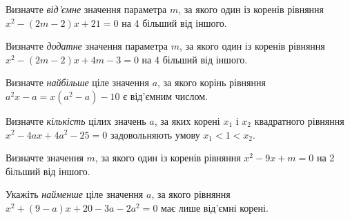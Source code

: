 \documentclass[12pt]{article}
\begin{document}
\begin{samepage}
\noindent\zadnum Визначте \textit{від'ємне} значення параметра $m$, за якого один із коренів рівняння $x^2 - (2m - 2)x + 21 = 0$ на 4 більший від іншого. 

\nmtnobreak
\nopagebreak\nbvspace{0.3cm}
\nmtAnswerBox
\par{}
\end{samepage}

\begin{samepage}
\noindent\zadnum Визначте \textit{додатне} значення параметра $m$, за якого один із коренів рівняння $x^2 - (2m - 2)x + 4m - 3 = 0$ на 4 більший від іншого. 

\nmtnobreak
\nopagebreak\nbvspace{0.3cm}
\nmtAnswerBox
\par{}
\end{samepage}

\begin{samepage}
\noindent\zadnum Визначте \textit{найбільше} ціле значення $a$, за якого корінь рівняння $a^2x - a = x(a^2 - a) - 10$ є від'ємним числом. 

\nmtnobreak
\nopagebreak\nbvspace{0.3cm}
\nmtAnswerBox
\par{}
\end{samepage}

\begin{samepage}
\noindent\zadnum Визначте \textit{кількість} цілих значень $a$, за яких корені $x_1$ і $x_2$ квадратного рівняння $x^2 - 4ax + 4a^2 - 25 = 0$ задовольняють умову $x_1 < 1 < x_2$. 

\nmtnobreak
\nopagebreak\nbvspace{0.3cm}
\nmtAnswerBox
\par{}
\end{samepage}

\begin{samepage}
\noindent\zadnum Визначте значення $m$, за якого один із коренів рівняння $x^2 - 9x + m = 0$ на 2 більший від іншого. 

\nmtnobreak
\nopagebreak\nbvspace{0.3cm}
\nmtAnswerBox
\par{}
\end{samepage}

\begin{samepage}
\noindent\zadnum Укажіть \textit{найменше} ціле значення $a$, за якого рівняння $x^2 + (9 - a)x + 20 - 3a - 2a^2 = 0$ має лише від'ємні корені. 

\nmtnobreak
\nopagebreak\nbvspace{0.3cm}
\nmtAnswerBox
\par{}
\end{samepage}
\end{document}
